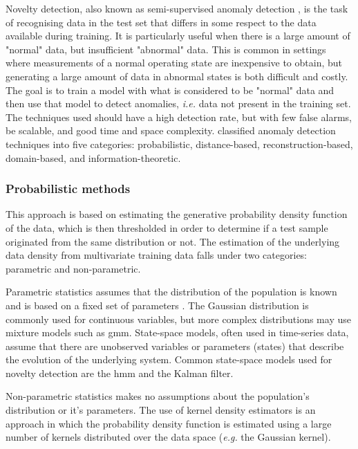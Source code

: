 Novelty detection, also known as semi-supervised anomaly detection \citep{Scikit-learn-novelty_detection}, is the task of recognising data in the test set that differs in some respect to the data available during training. It is particularly useful when there is a large amount of "normal" data, but insufficient "abnormal" data. This is common in settings where measurements of a normal operating state are inexpensive to obtain, but generating a large amount of data in abnormal states is both difficult and costly. The goal is to train a model with what is considered to be "normal" data and then use that model to detect anomalies, \textit{i.e.} data not present in the training set. The techniques used should have a high detection rate, but with few false alarms, be scalable, and good time and space complexity. \cite{pimentel2014review} classified anomaly detection techniques into five categories: probabilistic, distance-based, reconstruction-based, domain-based, and information-theoretic.

\subsubsection{Probabilistic methods}

This approach is based on estimating the generative probability density function of the data, which is then thresholded in order to determine if a test sample originated from the same distribution or not. The estimation of the underlying data density from multivariate training data falls under two categories: parametric and non-parametric.\par

Parametric statistics assumes that the distribution of the population is known and is based on a fixed set of parameters \citep{IBM_ParatericStatistics}. The Gaussian distribution is commonly used for continuous variables, but more complex distributions may use mixture models such as \gls{gmm}. State-space models, often used in time-series data, assume that there are unobserved variables or parameters (states) that describe the evolution of the underlying system. Common state-space models used for novelty detection are the \gls{hmm} and the Kalman filter.\par

Non-parametric statistics makes no assumptions about the population's distribution or it's parameters. The use of kernel density estimators is an approach in which the probability density function is estimated using a large number of kernels distributed over the data space (\textit{e.g.} the Gaussian kernel).\par

